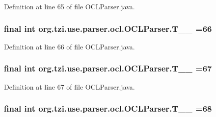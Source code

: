 Definition at line 65 of file O\-C\-L\-Parser.\-java.

\hypertarget{classorg_1_1tzi_1_1use_1_1parser_1_1ocl_1_1_o_c_l_parser_aaff25f0dd9f7095a0a598e0c290776b8}{
\subsubsection[{T\-\_\-\-\_\-66}]{\setlength{\rightskip}{0pt plus 5cm}final int org.\-tzi.\-use.\-parser.\-ocl.\-O\-C\-L\-Parser.\-T\-\_\-\-\_ =66\hspace{0.3cm}{\ttfamily [static]}}}\label{classorg_1_1tzi_1_1use_1_1parser_1_1ocl_1_1_o_c_l_parser_aaff25f0dd9f7095a0a598e0c290776b8}


Definition at line 66 of file O\-C\-L\-Parser.\-java.

\hypertarget{classorg_1_1tzi_1_1use_1_1parser_1_1ocl_1_1_o_c_l_parser_a99f73bb46cbf6ce149462ae9b1453d81}{
\subsubsection[{T\-\_\-\-\_\-67}]{\setlength{\rightskip}{0pt plus 5cm}final int org.\-tzi.\-use.\-parser.\-ocl.\-O\-C\-L\-Parser.\-T\-\_\-\-\_ =67\hspace{0.3cm}{\ttfamily [static]}}}\label{classorg_1_1tzi_1_1use_1_1parser_1_1ocl_1_1_o_c_l_parser_a99f73bb46cbf6ce149462ae9b1453d81}


Definition at line 67 of file O\-C\-L\-Parser.\-java.

\hypertarget{classorg_1_1tzi_1_1use_1_1parser_1_1ocl_1_1_o_c_l_parser_a81f3a53579b6c074d27c44820e156617}{
\subsubsection[{T\-\_\-\-\_\-68}]{\setlength{\rightskip}{0pt plus 5cm}final int org.\-tzi.\-use.\-parser.\-ocl.\-O\-C\-L\-Parser.\-T\-\_\-\-\_ =68\hspace{0.3cm}{\ttfamily [static]}}}\label{classorg_1_1tzi_1_1use_1_1parser_1_1ocl_1_1_o_c_l_parser_a81f3a53579b6c074d27c44820e156617}


